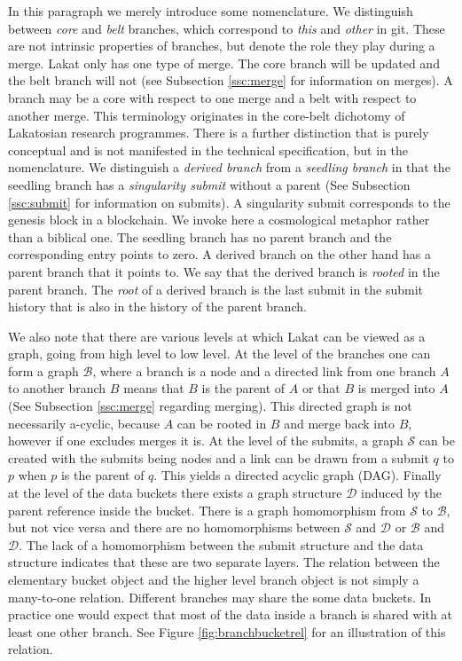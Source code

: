 \documentclass[14pt]{article}
\begin{document}
In this paragraph we merely introduce some nomenclature. We distinguish between \textit{core} and \textit{belt} branches, which correspond to \textit{this} and \textit{other} in git. These are not intrinsic properties of branches, but denote the role they play during a merge. Lakat only has one type of merge. The core branch will be updated and the belt branch will not (see Subsection \ref{ssc:merge} for information on merges). A branch may be a core with respect to one merge and a belt with respect to another merge. This terminology originates in the core-belt dichotomy of Lakatosian research programmes. There is a further distinction that is purely conceptual and is not manifested in the technical specification, but in the nomenclature. We distinguish a \textit{derived branch} from a \textit{seedling branch} in that the seedling branch has a \textit{singularity submit} without a parent (See Subsection \ref{ssc:submit} for information on submits). A singularity submit corresponds to the genesis block in a blockchain. We invoke here a cosmological metaphor rather than a biblical one. The seedling branch has no parent branch and the corresponding entry points to zero. A derived branch on the other hand has a parent branch that it points to. We say that the derived branch is \textit{rooted} in the parent branch. The \textit{root} of a derived branch is the last submit in the submit history that is also in the history of the parent branch.

We also note that there are various levels at which Lakat can be viewed as a graph, going from high level to low level. At the level of the branches one can form a graph $\mathcal B$, where a branch is a node and a directed link from one branch $A$ to another branch $B$ means that $B$ is the parent of $A$ or that $B$ is merged into $A$ (See Subsection \ref{ssc:merge} regarding merging). This directed graph is not necessarily a-cyclic, because $A$ can be rooted in $B$ and merge back into $B$, however if one excludes merges it is. At the level of the submits, a graph $\mathcal S$ can be created with the submits being nodes and a link can be drawn from a submit $q$ to $p$ when $p$ is the parent of $q$. This yields a directed acyclic graph (DAG). Finally at the level of the data buckets there exists a graph structure $\mathcal D$ induced by the parent reference inside the bucket. There is a graph homomorphism from $\mathcal S$ to $\mathcal B$, but not vice versa and there are no homomorphisms between $\mathcal S$ and $\mathcal D$ or $\mathcal B$ and $\mathcal D$. The lack of a homomorphism between the submit structure and the data structure indicates that these are two separate layers. The relation between the elementary bucket object and the higher level branch object is not simply a many-to-one relation. Different branches may share the some data buckets. In practice one would expect that most of the data inside a branch is shared with at least one other branch. See Figure \ref{fig:branchbucketrel} for an illustration of this relation.
\end{document}
